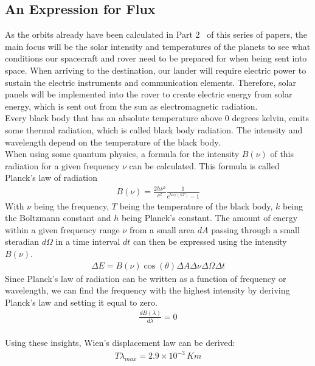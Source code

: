 \documentclass[reprint,english,notitlepage]{revtex4-2}
\begin{document}
\subsection{An Expression for Flux}\label{subsec:an-expression-for-flux}
As the orbits already have been calculated in Part 2~\parencite[][]{part2} of this series of papers, the main focus will be the solar intensity and temperatures of the planets to see what conditions our spacecraft and rover need to be prepared for when being sent into space.
When arriving to the destination, our lander will require electric power to sustain the electric instruments and communication elements.
Therefore, solar panels will be implemented into the rover to create electric energy from solar energy, which is sent out from the sun as electromagnetic radiation.\\
Every black body that has an absolute temperature above 0 degrees kelvin, emits some thermal radiation, which is called black body radiation.
The intensity and wavelength depend on the temperature of the black body.\\
When using some quantum physics, a formula for the intensity $B(\nu)$ of this radiation for a given frequency $\nu$ can be calculated.
This formula is called Planck's law of radiation
\begin{align*}
    B(\nu) = \frac{2h\nu^3}{c^2}\frac{1}{e^{h\nu/(kT)}-1}
\end{align*}
With $\nu$ being the frequency, $T$ being the temperature of the black body, $k$ being the Boltzmann constant and $h$ being Planck's constant.
The amount of energy within a given frequency range $\nu$ from a small area $dA$ passing through a small steradian $d\Omega$ in a time interval $dt$ can then be expressed using the intensity $B(\nu)$.
\begin{align*}
    \Delta E = B(\nu) \cos\left(\theta\right) \Delta A \Delta\nu \Delta\Omega \Delta t
\end{align*}
Since Planck's law of radiation can be written as a function of frequency or wavelength, we can find the frequency with the highest intensity by deriving Planck's law and setting it equal to zero.
\begin{align*}
	\frac{dB(\lambda)}{d\lambda} = 0
\end{align*}\\
Using these insights, Wien's displacement law can be derived:
\begin{align*}
    T\lambda_{max} = 2.9 \times 10^{-3} \, Km
\end{align*}\\
\end{document}
